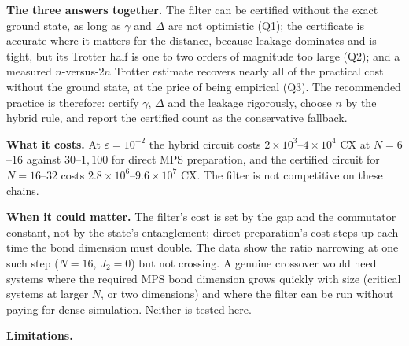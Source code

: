 \documentclass[
]{article}
\begin{document}
\textbf{The three answers together.} The filter can be certified without
the exact ground state, as long as \(\gamma\) and \(\Delta\) are not
optimistic (Q1); the certificate is accurate where it matters for the
distance, because leakage dominates and is tight, but its Trotter half
is one to two orders of magnitude too large (Q2); and a measured
\(n\)-versus-\(2n\) Trotter estimate recovers nearly all of the
practical cost without the ground state, at the price of being empirical
(Q3). The recommended practice is therefore: certify \(\gamma\),
\(\Delta\) and the leakage rigorously, choose \(n\) by the hybrid rule,
and report the certified count as the conservative fallback.

\textbf{What it costs.} At \(\varepsilon=10^{-2}\) the hybrid circuit
costs \(2\times10^{3}\)--\(4\times10^{4}\) CX at \(N=6\)--\(16\) against
\(30\)--\(1{,}100\) for direct MPS preparation, and the certified
circuit for \(N=16\)--\(32\) costs
\(2.8\times10^{6}\)--\(9.6\times10^{7}\) CX. The filter is not
competitive on these chains.

\textbf{When it could matter.} The filter's cost is set by the gap and
the commutator constant, not by the state's entanglement; direct
preparation's cost steps up each time the bond dimension must double.
The data show the ratio narrowing at one such step (\(N=16\), \(J_2=0\))
but not crossing. A genuine crossover would need systems where the
required MPS bond dimension grows quickly with size (critical systems at
larger \(N\), or two dimensions) and where the filter can be run without
paying for dense simulation. Neither is tested here.

\textbf{Limitations.}
\end{document}

